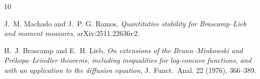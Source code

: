 \documentclass[11pt]{amsart}
\theoremstyle{remark}
\begin{document}
\begin{thebibliography}{10}

J.~M. Machado and J.~P. G. Ramos,
\textit{Quantitative stability for Brascamp--Lieb and moment measures},
arXiv:2511.22636v2.

H.~J. Brascamp and E.~H. Lieb,
\textit{On extensions of the Brunn--Minkowski and Pr\'ekopa--Leindler theorems,
including inequalities for log-concave functions, and with an application to
the diffusion equation},
J.~Funct.~Anal. 22 (1976), 366--389.

\end{thebibliography}
\end{document}
